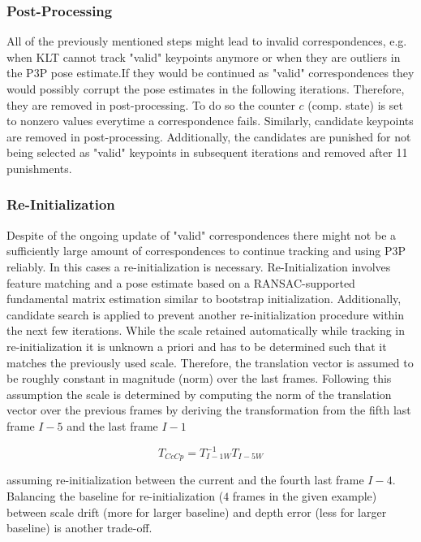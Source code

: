 \documentclass[letterpaper, 12 pt]{article}
\begin{document}
\begin{multicols*}{2}
\subsubsection{Post-Processing}
All of the previously mentioned steps might lead to invalid correspondences, e.g. when KLT cannot track "valid" keypoints anymore or when they are outliers in the P3P pose estimate.If they would be continued as "valid" correspondences they would possibly corrupt the pose estimates in the following iterations. Therefore, they are removed in post-processing. To do so the counter $c$ (comp. state) is set to nonzero values everytime a correspondence fails. 
\newline
Similarly, candidate keypoints are removed in post-processing. Additionally, the candidates are punished for not being selected as "valid" keypoints in subsequent iterations and removed after 11 punishments. 

\subsubsection{Re-Initialization}
Despite of the ongoing update of "valid" correspondences there might not be a sufficiently large amount of correspondences to continue tracking and using P3P reliably. In this cases a re-initialization is necessary. 
\newline
Re-Initialization involves feature matching and a pose estimate based on a RANSAC-supported fundamental matrix estimation similar to bootstrap initialization. Additionally, candidate search is applied to prevent another re-initialization procedure within the next few iterations. While the scale retained automatically while tracking in re-initialization it is unknown a priori and has to be determined such that it matches the previously used scale. Therefore, the translation vector is assumed to be roughly constant in magnitude (norm) over the last frames. Following this assumption the scale is determined by computing the norm of the translation vector over the previous frames by deriving the transformation from the fifth last frame $I-5$ and the last frame $I-1$

$$T_{CcCp} = T_{I-1W}^{-1} T_{I-5W}$$

assuming re-initialization between the current and the fourth last frame $I-4$. Balancing the baseline for re-initialization ($4$ frames in the given example) between scale drift (more for larger baseline) and depth error (less for larger baseline) is another trade-off.  


\end{multicols*}
\end{document}

